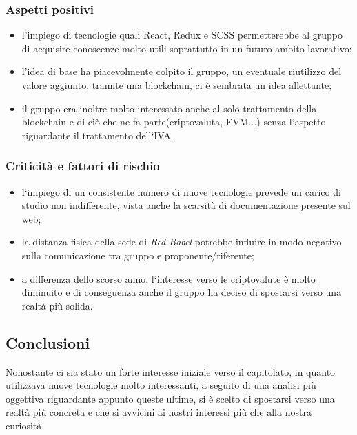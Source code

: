 \documentclass{article}
\begin{document}
	
	\subsubsection{Aspetti positivi} 
	\begin{itemize}
		\item l'impiego di tecnologie quali React, Redux e SCSS permetterebbe al gruppo di acquisire conoscenze molto utili soprattutto in un futuro ambito lavorativo;
		
		\item l'idea di base ha piacevolmente colpito il gruppo, un eventuale riutilizzo del valore aggiunto, tramite una blockchain, ci è sembrata un idea allettante;
		
		\item il gruppo era inoltre molto interessato anche al solo trattamento della blockchain e di ciò che ne fa parte(criptovaluta, EVM...) senza l`aspetto riguardante il trattamento dell`IVA.
	\end{itemize}
	
	\subsubsection{Criticità e fattori di rischio}
	
	\begin{itemize}
	\item l`impiego di un consistente numero di nuove tecnologie prevede un carico di studio non indifferente, vista anche la scarsità di documentazione presente sul web;
	
	\item la distanza fisica della sede di \textit{Red Babel} potrebbe influire in modo negativo sulla comunicazione tra gruppo e proponente/riferente; 
	
	\item a differenza dello scorso anno, l`interesse verso le criptovalute è molto diminuito e di conseguenza anche il gruppo ha deciso di spostarsi verso una realtà più solida.  
	\end{itemize}
	
	\subsection{Conclusioni}
	Nonostante ci sia stato un forte interesse iniziale verso il capitolato, in quanto utilizzava nuove tecnologie molto interessanti, a seguito di una analisi più oggettiva riguardante appunto queste ultime, si è scelto di spostarsi verso una realtà più concreta e che si avvicini ai nostri interessi più che alla nostra curiosità.  
	
\end{document}
